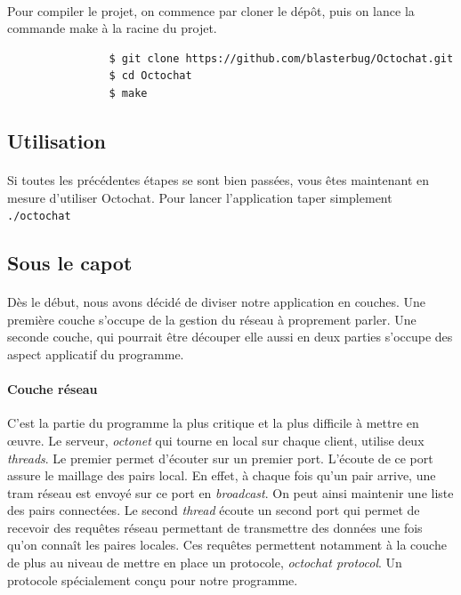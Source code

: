 \documentclass[a4paper]{article}
\begin{document}
			\paragraph{}{
				Pour compiler le projet, on commence par cloner le dépôt, puis on lance la commande make à la racine du projet.
			}

			\begin{verbatim}
				$ git clone https://github.com/blasterbug/Octochat.git
				$ cd Octochat
				$ make
			\end{verbatim}

		\subsection{Utilisation}
			\paragraph{}{
			Si toutes les précédentes étapes se sont bien passées, vous êtes maintenant en mesure d'utiliser Octochat.
			Pour lancer l'application taper simplement \verb|./octochat|
			}

		\subsection{Sous le capot}
			\paragraph{}{
			Dès le début, nous avons décidé de diviser notre application en couches.
			Une première couche s'occupe de la gestion du réseau à proprement parler. Une seconde couche,
			qui pourrait être découper elle aussi en deux parties s'occupe des aspect applicatif du programme.
			}

			\paragraph{Couche réseau}{
			C'est la partie du programme la plus critique et la plus difficile à mettre en œuvre.
			Le serveur, \textit{octonet} qui tourne en local sur chaque client, utilise deux \textit{threads}.
			Le premier permet d'écouter sur un premier port. L'écoute de ce port assure le maillage des pairs local.
			En effet, à chaque fois qu'un pair arrive, une tram réseau est envoyé sur ce port en \textit{broadcast}.
			On peut ainsi maintenir une liste des pairs connectées.
			Le second \textit{thread} écoute un second port qui permet de recevoir des requêtes réseau permettant de
			transmettre des données une fois qu'on connaît les paires locales. Ces requêtes permettent notamment à
			la couche de plus au niveau de mettre en place un protocole, \textit{octochat protocol}. Un protocole
			spécialement conçu pour notre programme.
			}
\end{document}
